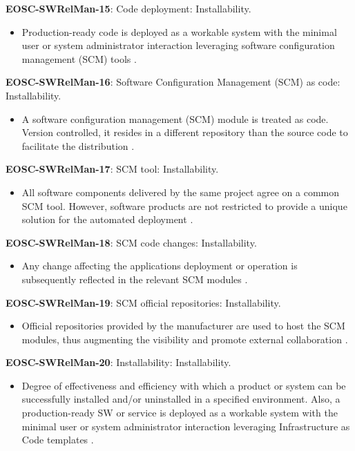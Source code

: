\textbf{EOSC-SWRelMan-15}: Code deployment: Installability.

\begin{itemize}
    \item Production-ready code is deployed as a workable system with the minimal user or system administrator interaction leveraging software configuration management (SCM) tools \cite{orviz_set_2017}.
\end{itemize}

\textbf{EOSC-SWRelMan-16}: Software Configuration Management (SCM) as code: Installability.

\begin{itemize}
    \item A software configuration management (SCM) module is treated as code. Version controlled, it resides in a different repository than the source code to facilitate the distribution \cite{orviz_set_2017}.
\end{itemize}

\textbf{EOSC-SWRelMan-17}: SCM tool: Installability.

\begin{itemize}
    \item All software components delivered by the same project agree on a common SCM tool. However, software products are not restricted to provide a unique solution for the automated deployment \cite{orviz_set_2017}.
\end{itemize}

\textbf{EOSC-SWRelMan-18}: SCM code changes: Installability.

\begin{itemize}
    \item Any change affecting the applications deployment or operation is subsequently reflected in the relevant SCM modules \cite{orviz_set_2017}.
\end{itemize}

\textbf{EOSC-SWRelMan-19}: SCM official repositories: Installability.

\begin{itemize}
    \item Official repositories provided by the manufacturer are used to host the SCM modules, thus augmenting the visibility and promote external collaboration \cite{orviz_set_2017}.
\end{itemize}

\textbf{EOSC-SWRelMan-20}: Installability: Installability.

\begin{itemize}
    \item Degree of effectiveness and efficiency with which a product or system can be successfully installed and/or uninstalled in a specified environment. Also, a production-ready SW or service is deployed as a workable system with the minimal user or system administrator interaction leveraging Infrastructure as Code templates \cite{iso_25010_2011_2017,orviz_fernandez_eosc-synergy_2020}.
\end{itemize}

